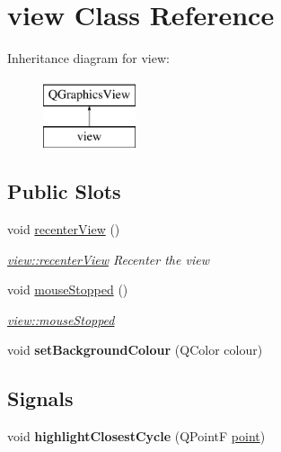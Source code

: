 \hypertarget{classview}{}\section{view Class Reference}
\label{classview}
Inheritance diagram for view\+:\begin{figure}[H]
\begin{center}
\leavevmode
\includegraphics[height=2.000000cm]{classview}
\end{center}
\end{figure}
\subsection*{Public Slots}
\begin{DoxyCompactItemize}
\item 
void \mbox{\hyperlink{classview_a7fff213d7f38eeb2c8943609264fa518}{recenter\+View}} ()
\begin{DoxyCompactList}\small\item\em \mbox{\hyperlink{classview_a7fff213d7f38eeb2c8943609264fa518}{view\+::recenter\+View}} Recenter the view \end{DoxyCompactList}\item 
void \mbox{\hyperlink{classview_ab1d79ebdee961d5ec07ed11f461158a5}{mouse\+Stopped}} ()
\begin{DoxyCompactList}\small\item\em \mbox{\hyperlink{classview_ab1d79ebdee961d5ec07ed11f461158a5}{view\+::mouse\+Stopped}} \end{DoxyCompactList}\item 
\mbox{\label{classview_a3eedee38e4dfa3d2fa7f30f52c36438b}} 
void {\bfseries set\+Background\+Colour} (Q\+Color colour)
\end{DoxyCompactItemize}
\subsection*{Signals}
\begin{DoxyCompactItemize}
\item 
\mbox{\label{classview_ab0e83744c774f7cb76dbfc8ce12c4186}} 
void {\bfseries highlight\+Closest\+Cycle} (Q\+PointF \mbox{\hyperlink{classpoint}{point}})
\end{DoxyCompactItemize}
